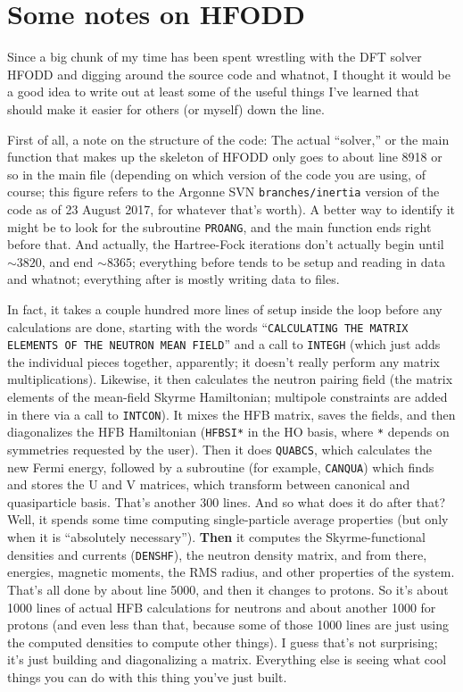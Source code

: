 \chapter{Some notes on HFODD}

Since a big chunk of my time has been spent wrestling with the DFT solver HFODD and digging around the source code and whatnot, I thought it would be a good idea to write out at least some of the useful things I've learned that should make it easier for others (or myself) down the line.

First of all, a note on the structure of the code: The actual ``solver,'' or the main function that makes up the skeleton of HFODD only goes to about line 8918 or so in the main file (depending on which version of the code you are using, of course; this figure refers to the Argonne SVN \texttt{branches/inertia} version of the code as of 23 August 2017, for whatever that's worth). A better way to identify it might be to look for the subroutine \texttt{PROANG}, and the main function ends right before that. And actually, the Hartree-Fock iterations don't actually begin until $\sim3820$, and end $\sim8365$; everything before tends to be setup and reading in data and whatnot; everything after is mostly writing data to files.

In fact, it takes a couple hundred more lines of setup inside the loop before any calculations are done, starting with the words ``\texttt{CALCULATING THE MATRIX ELEMENTS OF THE NEUTRON MEAN FIELD}'' and a call to \texttt{INTEGH} (which just adds the individual pieces together, apparently; it doesn't really perform any matrix multiplications). Likewise, it then calculates the neutron pairing field (the matrix elements of the mean-field Skyrme Hamiltonian; multipole constraints are added in there via a call to \texttt{INTCON}). It mixes the HFB matrix, saves the fields, and then diagonalizes the HFB Hamiltonian (\texttt{HFBSI*} in the HO basis, where \texttt{*} depends on symmetries requested by the user). Then it does \texttt{QUABCS}, which calculates the new Fermi energy, followed by a subroutine (for example, \texttt{CANQUA}) which finds and stores the U and V matrices, which transform between canonical and quasiparticle basis. That's another 300 lines. And so what does it do after that? Well, it spends some time computing single-particle average properties (but only when it is ``absolutely necessary''). \textbf{Then} it computes the Skyrme-functional densities and currents (\texttt{DENSHF}), the neutron density matrix, and from there, energies, magnetic moments, the RMS radius, and other properties of the system. That's all done by about line 5000, and then it changes to protons. So it's about 1000 lines of actual HFB calculations for neutrons and about another 1000 for protons (and even less than that, because some of those 1000 lines are just using the computed densities to compute other things). I guess that's not surprising; it's just building and diagonalizing a matrix. Everything else is seeing what cool things you can do with this thing you've just built.

